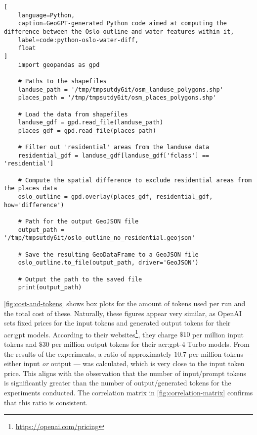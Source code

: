\begin{lstlisting}[
    language=Python,
    caption=GeoGPT-generated Python code aimed at computing the difference between the Oslo outline and water features within it,
    label=code:python-oslo-water-diff,
    float
]
    import geopandas as gpd

    # Paths to the shapefiles
    landuse_path = '/tmp/tmpsutdy6it/osm_landuse_polygons.shp'
    places_path = '/tmp/tmpsutdy6it/osm_places_polygons.shp'
    
    # Load the data from shapefiles
    landuse_gdf = gpd.read_file(landuse_path)
    places_gdf = gpd.read_file(places_path)
    
    # Filter out 'residential' areas from the landuse data
    residential_gdf = landuse_gdf[landuse_gdf['fclass'] == 'residential']
     
    # Compute the spatial difference to exclude residential areas from the places data
    oslo_outline = gpd.overlay(places_gdf, residential_gdf, how='difference')
    
    # Path for the output GeoJSON file
    output_path = '/tmp/tmpsutdy6it/oslo_outline_no_residential.geojson'
    
    # Save the resulting GeoDataFrame to a GeoJSON file
    oslo_outline.to_file(output_path, driver='GeoJSON')
    
    # Output the path to the saved file
    print(output_path)    
\end{lstlisting}

\autoref{fig:cost-and-tokens} shows box plots for the amount of tokens used per run and the total cost of these. Naturally, these figures appear very similar, as OpenAI sets fixed prices for the input tokens and generated output tokens for their \acrshort{acr:gpt} models. According to their websites\footnote{\url{https://openai.com/pricing}}, they charge $\$10$ per million input tokens and $\$30$ per million output tokens for their \acrshort{acr:gpt}-4 Turbo models. From the results of the experiments, a ratio of approximately $10.7$ per million tokens --- either input \textit{or} output --- was calculated, which is very close to the input token price. This aligns with the observation that the number of input/prompt tokens is significantly greater than the number of output/generated tokens for the experiments conducted. The correlation matrix in \autoref{fig:correlation-matrix} confirms that this ratio is consistent.

